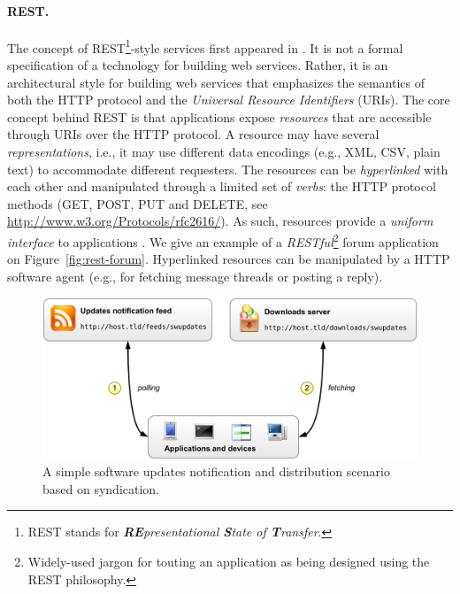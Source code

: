 \paragraph{REST.}
The concept of REST\footnote{REST stands for \emph{\textbf{RE}presentational \textbf{S}tate of \textbf{T}ransfer}.}-style services first appeared in \cite{RTF00}. It is not a formal specification of a technology for building web services. Rather, it is an architectural style for building web services that emphasizes the semantics of both the HTTP protocol and the \emph{Universal Resource Identifiers} (URIs).
The core concept behind REST is that applications expose \emph{resources} that are accessible through URIs over the HTTP protocol. A resource may have several \emph{representations}, i.e., it may use different data encodings (e.g., XML, CSV, plain text) to accommodate different requesters. The resources can be \emph{hyperlinked} with each other and manipulated through a limited set of \emph{verbs}: the HTTP protocol methods (\textsf{GET}, \textsf{POST}, \textsf{PUT} and \textsf{DELETE}, see \url{http://www.w3.org/Protocols/rfc2616/}). As such, resources provide a \emph{uniform interface} to applications \cite{RTF00}.
We give an example of a \emph{RESTful}\footnote{Widely-used jargon for touting an application as being designed using the REST philosophy.} forum application on Figure~\ref{fig:rest-forum}. Hyperlinked resources can be manipulated by a HTTP software agent (e.g., for fetching message threads or posting a reply).

\begin{figure}[htbp]
    \centering
    \includegraphics[width=\textwidth]{content/web-services/syndication-scenario}
    \caption{A simple software updates notification and distribution scenario based on syndication.} 
    \label{fig:syndication-scenario}
\end{figure}

